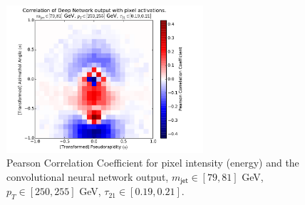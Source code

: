 \begin{figure}[h!]
  \centering
  \includegraphics[width=0.65\textwidth]{figures/pixel-activations-corr-benwindow.pdf}
  \caption{Pearson Correlation Coefficient for pixel intensity (energy) and the convolutional neural network output, $m_{\mathsf{jet}}\in [79, 81]$ GeV, $p_{T}\in [250, 255]$ GeV, $\tau_{21}\in[0.19, 0.21]$.}
  \label{fig:corrWindow}
\end{figure}

%




